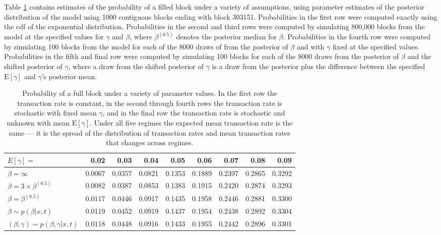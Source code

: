 \documentclass{article}
\begin{document}
 Table \ref{tab:probsims} contains estimates of the probability of a filled block under a variety of assumptions, using parameter estimates of the posterior distribution of the model using 1000 contiguous blocks ending with block 303151. Probabilities in the first row were computed exactly using the cdf of the exponential distribution. Probabilities in the second and third rows were computed by simulating 800,000 blocks from the model at the specified values for $\gamma$ and $\beta$, where $\beta^{(0.5)}$ denotes the posterior median for $\beta$. Probabilities in the fourth row were computed by simulating 100 blocks from the model for each of the 8000 draws of from the posterior of $\beta$ and with $\gamma$ fixed at the specified values. Probabilities in the fifth and final row were computed by simulating 100 blocks for each of the 8000 draws from the posterior of $\beta$ and the shifted posterior of $\gamma$, where a draw from the shifted posterior of $\gamma$ is a draw from the posterior plus the difference between the specified $\mathrm{E}[\gamma]$ and $\gamma$'s posterior mean. 
\begin{table}[ht]
\centering
\begin{tabular}{lrrrrrrrr}
  \hline
$E[\gamma] =$ & 0.02 & 0.03 & 0.04 & 0.05 & 0.06 & 0.07 & 0.08 & 0.09 \\ 
  \hline
$\beta = \infty$ & 0.0067 & 0.0357 & 0.0821 & 0.1353 & 0.1889 & 0.2397 & 0.2865 & 0.3292 \\ 
  $\beta = 3\times\beta^{(0.5)}$ & 0.0082 & 0.0387 & 0.0853 & 0.1383 & 0.1915 & 0.2420 & 0.2874 & 0.3293 \\ 
  $\beta = \beta^{(0.5)}$ & 0.0117 & 0.0446 & 0.0917 & 0.1435 & 0.1958 & 0.2446 & 0.2881 & 0.3300 \\ 
  $\beta \sim p(\beta|x,t)$ & 0.0119 & 0.0452 & 0.0919 & 0.1437 & 0.1954 & 0.2438 & 0.2892 & 0.3304 \\ 
  $(\beta,\gamma) \sim p(\beta,\gamma|x,t)$ & 0.0118 & 0.0448 & 0.0916 & 0.1433 & 0.1955 & 0.2442 & 0.2896 & 0.3301 \\ 
   \hline
\end{tabular}
\caption{Probability of a full block under a variety of parameter values. In the first row the transaction rate is constant, in the second through fourth rows the transaction rate is stochastic with fixed mean $\gamma$, and in the final row the transaction rate is stochastic and unknown with mean $\mathrm{E}[\gamma]$. Under all five regimes the expected mean transaction rate is the same --- it is the spread of the distribution of transaction rates and mean transaction rates that changes across regimes.}
\label{tab:probsims}
\end{table}
\end{document}
